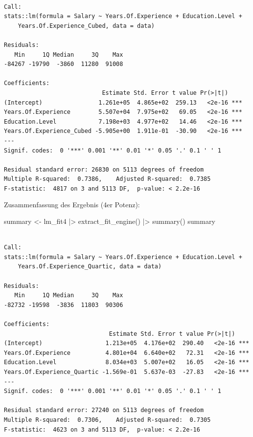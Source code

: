 \documentclass[
  letterpaper,
  DIV=11,
  numbers=noendperiod]{scrartcl}
\newenvironment{Shaded}{\begin{snugshade}}{\end{snugshade}}
\newcommand{\FunctionTok}[1]{\textcolor[rgb]{0.28,0.35,0.67}{#1}}
\newcommand{\NormalTok}[1]{\textcolor[rgb]{0.00,0.23,0.31}{#1}}
\newcommand{\OtherTok}[1]{\textcolor[rgb]{0.00,0.23,0.31}{#1}}
\newcommand{\SpecialCharTok}[1]{\textcolor[rgb]{0.37,0.37,0.37}{#1}}
\begin{document}
\begin{verbatim}

Call:
stats::lm(formula = Salary ~ Years.Of.Experience + Education.Level + 
    Years.Of.Experience_Cubed, data = data)

Residuals:
   Min     1Q Median     3Q    Max 
-84267 -19790  -3860  11280  91008 

Coefficients:
                            Estimate Std. Error t value Pr(>|t|)    
(Intercept)                1.261e+05  4.865e+02  259.13   <2e-16 ***
Years.Of.Experience        5.507e+04  7.975e+02   69.05   <2e-16 ***
Education.Level            7.198e+03  4.977e+02   14.46   <2e-16 ***
Years.Of.Experience_Cubed -5.905e+00  1.911e-01  -30.90   <2e-16 ***
---
Signif. codes:  0 '***' 0.001 '**' 0.01 '*' 0.05 '.' 0.1 ' ' 1

Residual standard error: 26830 on 5113 degrees of freedom
Multiple R-squared:  0.7386,    Adjusted R-squared:  0.7385 
F-statistic:  4817 on 3 and 5113 DF,  p-value: < 2.2e-16
\end{verbatim}

Zusammenfassung des Ergebnis (4er Potenz):

\begin{Shaded}
\begin{Highlighting}[]
\NormalTok{summary }\OtherTok{\textless{}{-}}\NormalTok{ lm\_fit4 }\SpecialCharTok{|\textgreater{}} \FunctionTok{extract\_fit\_engine}\NormalTok{() }\SpecialCharTok{|\textgreater{}} \FunctionTok{summary}\NormalTok{()}
\NormalTok{summary}
\end{Highlighting}
\end{Shaded}

\begin{verbatim}

Call:
stats::lm(formula = Salary ~ Years.Of.Experience + Education.Level + 
    Years.Of.Experience_Quartic, data = data)

Residuals:
   Min     1Q Median     3Q    Max 
-82732 -19598  -3836  11803  90306 

Coefficients:
                              Estimate Std. Error t value Pr(>|t|)    
(Intercept)                  1.213e+05  4.176e+02  290.40   <2e-16 ***
Years.Of.Experience          4.801e+04  6.640e+02   72.31   <2e-16 ***
Education.Level              8.034e+03  5.007e+02   16.05   <2e-16 ***
Years.Of.Experience_Quartic -1.569e-01  5.637e-03  -27.83   <2e-16 ***
---
Signif. codes:  0 '***' 0.001 '**' 0.01 '*' 0.05 '.' 0.1 ' ' 1

Residual standard error: 27240 on 5113 degrees of freedom
Multiple R-squared:  0.7306,    Adjusted R-squared:  0.7305 
F-statistic:  4623 on 3 and 5113 DF,  p-value: < 2.2e-16
\end{verbatim}
\end{document}
